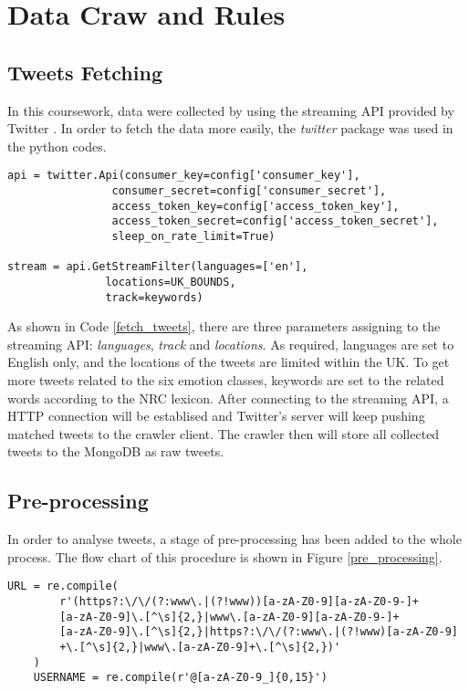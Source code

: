 \section{Data Craw and Rules}

\subsection{Tweets Fetching}

In this coursework, data were collected by using the streaming API provided by Twitter \cite{twitter_streaming}. In order to fetch the data more easily, the \textit{twitter} package was used in the python codes.


\begin{lstlisting}[caption={Fetch Tweets},captionpos=b,label={fetch_tweets}]
api = twitter.Api(consumer_key=config['consumer_key'],
                consumer_secret=config['consumer_secret'],
                access_token_key=config['access_token_key'],
                access_token_secret=config['access_token_secret'],
                sleep_on_rate_limit=True)

stream = api.GetStreamFilter(languages=['en'],
               locations=UK_BOUNDS,
               track=keywords)
\end{lstlisting}

As shown in Code \ref{fetch_tweets}, there are three parameters assigning to the streaming API: \textit{languages}, \textit{track} and \textit{locations}. As required, languages are set to English only, and the locations of the tweets are limited within the UK. To get more tweets related to the six emotion classes, keywords are set to the related words according to the NRC lexicon. After connecting to the streaming API, a HTTP connection will be establised and Twitter's server will keep pushing matched tweets to the crawler client. The crawler then will store all collected tweets to the MongoDB as raw tweets. 

\subsection{Pre-processing}

In order to analyse tweets, a stage of pre-processing has been added to the whole process. The flow chart of this procedure is shown in Figure \ref{pre_processing}.

\begin{lstlisting}[caption={Regular Expression},captionpos=b,label={regex}]
    URL = re.compile(
        r'(https?:\/\/(?:www\.|(?!www))[a-zA-Z0-9][a-zA-Z0-9-]+
        [a-zA-Z0-9]\.[^\s]{2,}|www\.[a-zA-Z0-9][a-zA-Z0-9-]+
        [a-zA-Z0-9]\.[^\s]{2,}|https?:\/\/(?:www\.|(?!www)[a-zA-Z0-9]
        +\.[^\s]{2,}|www\.[a-zA-Z0-9]+\.[^\s]{2,})'
    )
    USERNAME = re.compile(r'@[a-zA-Z0-9_]{0,15}')
\end{lstlisting}


